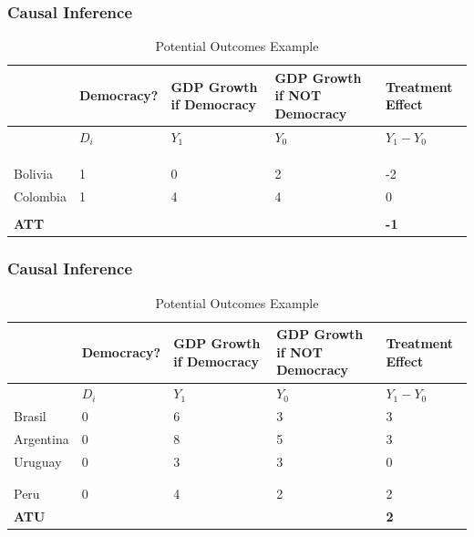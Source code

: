 \documentclass[xcolor=x11names,compress]{beamer}\usepackage[]{graphicx}\usepackage[]{color}
\renewcommand{\(}{\begin{columns}}
\renewcommand{\)}{\end{columns}}
\newcommand{\<}[1]{\begin{column}{#1}}
\renewcommand{\>}{\end{column}}
\begin{document}
\begin{frame}
\frametitle{Causal Inference}
\scriptsize
\begin{table}[htbp]
  \centering
  \caption{Potential Outcomes Example}
    \begin{tabular}{|p{1.8cm}|p{1.8cm}|p{2cm}|p{2cm}|p{2cm}|}
    \hline
          & \multicolumn{1}{p{1.8cm}|}{Democracy?} & \multicolumn{1}{p{2cm}|}{GDP Growth if Democracy} & \multicolumn{1}{p{2.2cm}|}{GDP Growth if NOT Democracy} & \textbf{Treatment Effect} \bigstrut\\
    \hline
          & \multicolumn{1}{p{1.8cm}|}{$D_i$} & \multicolumn{1}{p{2cm}|}{$Y_1$} & \multicolumn{1}{p{2.2cm}|}{$Y_0$} & \multicolumn{1}{p{1.8cm}|}{$Y_{1} - Y_{0}$} \bigstrut\\
    \hline
     &  &      &      &  \bigstrut\\
    \hline
     &  &     &      &  \bigstrut\\
    \hline
     &  &  &  &   \bigstrut\\
    \hline
    Bolivia & 1 & 0     & 2     & -2 \bigstrut\\
    \hline
    Colombia & 1 & 4    & 4    & 0 \bigstrut\\
    \hline
     &  &      &      &  \bigstrut\\
    \hline
    \textbf{ATT} & & & & \textbf{-1} \bigstrut\\
    \hline
    \end{tabular}%
  \label{tab:addlabel}%
\end{table}%
\normalsize
\end{frame}

\begin{frame}
\frametitle{Causal Inference}
\scriptsize
\begin{table}[htbp]
  \centering
  \caption{Potential Outcomes Example}
    \begin{tabular}{|p{1.8cm}|p{1.8cm}|p{2cm}|p{2cm}|p{2cm}|}
    \hline
          & \multicolumn{1}{p{1.8cm}|}{Democracy?} & \multicolumn{1}{p{2cm}|}{GDP Growth if Democracy} & \multicolumn{1}{p{2.2cm}|}{GDP Growth if NOT Democracy} & \textbf{Treatment Effect} \bigstrut\\
    \hline
          & \multicolumn{1}{p{1.8cm}|}{$D_i$} & \multicolumn{1}{p{2cm}|}{$Y_1$} & \multicolumn{1}{p{2.2cm}|}{$Y_0$} & \multicolumn{1}{p{1.8cm}|}{$Y_{1} - Y_{0}$} \bigstrut\\
    \hline
    Brasil & 0 & 6     & 3     & 3 \bigstrut\\
    \hline
    Argentina & 0 & 8    & 5     & 3 \bigstrut\\
    \hline
    Uruguay & 0 & 3 & 3 & 0  \bigstrut\\
    \hline
     &  &      &     &  \bigstrut\\
    \hline
     &  &     &     &  \bigstrut\\
    \hline
    Peru & 0 & 4     & 2     & 2 \bigstrut\\
    \hline
    \textbf{ATU} & & & & \textbf{2} \bigstrut\\
    \hline
    \end{tabular}%
  \label{tab:addlabel}%
\end{table}%
\normalsize
\end{frame}
\end{document}
